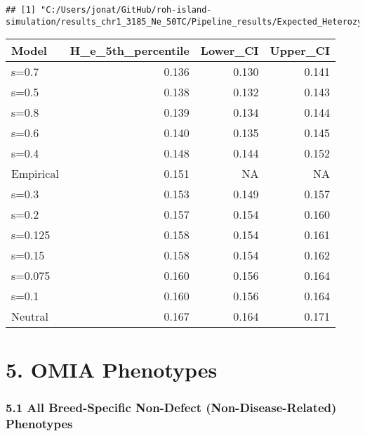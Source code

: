 \documentclass[
]{article}
\begin{document}
\begin{verbatim}
## [1] "C:/Users/jonat/GitHub/roh-island-simulation/results_chr1_3185_Ne_50TC/Pipeline_results/Expected_Heterozygosity_Summary.txt"
\end{verbatim}

\begin{longtable}[]{@{}lrrr@{}}
\toprule\noalign{}
Model & H\_e\_5th\_percentile & Lower\_CI & Upper\_CI \\
\midrule\noalign{}
\endhead
\bottomrule\noalign{}
\endlastfoot
s=0.7 & 0.136 & 0.130 & 0.141 \\
s=0.5 & 0.138 & 0.132 & 0.143 \\
s=0.8 & 0.139 & 0.134 & 0.144 \\
s=0.6 & 0.140 & 0.135 & 0.145 \\
s=0.4 & 0.148 & 0.144 & 0.152 \\
Empirical & 0.151 & NA & NA \\
s=0.3 & 0.153 & 0.149 & 0.157 \\
s=0.2 & 0.157 & 0.154 & 0.160 \\
s=0.125 & 0.158 & 0.154 & 0.161 \\
s=0.15 & 0.158 & 0.154 & 0.162 \\
s=0.075 & 0.160 & 0.156 & 0.164 \\
s=0.1 & 0.160 & 0.156 & 0.164 \\
Neutral & 0.167 & 0.164 & 0.171 \\
\end{longtable}

\section{5. OMIA Phenotypes}\label{omia-phenotypes}

\subsubsection{5.1 All Breed-Specific Non-Defect (Non-Disease-Related)
Phenotypes}\label{all-breed-specific-non-defect-non-disease-related-phenotypes}
\end{document}
